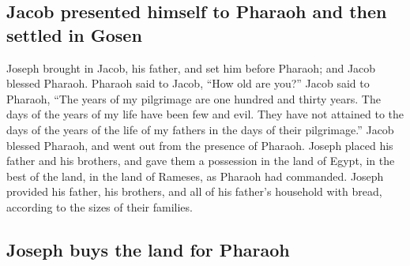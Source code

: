 \hypertarget{jacob-presented-himself-to-pharaoh-and-then-settled-in-gosen}{%
\subsection{Jacob presented himself to Pharaoh and then settled in
Gosen}\label{jacob-presented-himself-to-pharaoh-and-then-settled-in-gosen}}

 Joseph brought in Jacob, his father, and set him before
Pharaoh; and Jacob blessed Pharaoh.  Pharaoh said to
Jacob, ``How old are you?''  Jacob said to Pharaoh, ``The
years of my pilgrimage are one hundred and thirty years. The days of the
years of my life have been few and evil. They have not attained to the
days of the years of the life of my fathers in the days of their
pilgrimage.''  Jacob blessed Pharaoh, and went out from
the presence of Pharaoh.  Joseph placed his father and
his brothers, and gave them a possession in the land of Egypt, in the
best of the land, in the land of Rameses, as Pharaoh had commanded.
 Joseph provided his father, his brothers, and all of his
father's household with bread, according to the sizes of their families.

\hypertarget{joseph-buys-the-land-for-pharaoh}{%
\subsection{Joseph buys the land for
Pharaoh}\label{joseph-buys-the-land-for-pharaoh}}


